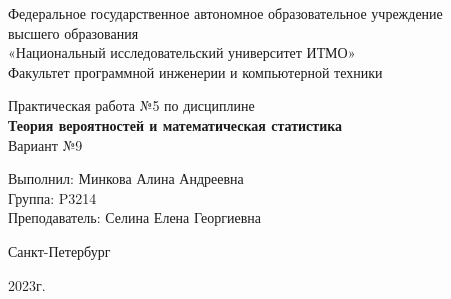 \begin{center}
	{\large
	Федеральное государственное автономное образовательное учреждение\\
	высшего образования\\
	«Национальный исследовательский университет ИТМО»\\

	\vspace{5pt}
	Факультет программной инженерии и компьютерной техники\\
	}
	\vspace{17em}

	{\Large Практическая работа №5} \Large по дисциплине\\
	\smallskip
	{\LARGE \textbf{Теория вероятностей и
			математическая статистика}}\\[1em]
	{\large Вариант №9}


\end{center}

\vspace{20em}
{\large
\begin{flushright}
	Выполнил: Минкова Алина Андреевна\\
	Группа: P3214\\
	Преподаватель: Селина Елена Георгиевна\\
\end{flushright}

\vspace{\fill}

\begin{center}
	Санкт-Петербург

	2023г.
\end{center}
}